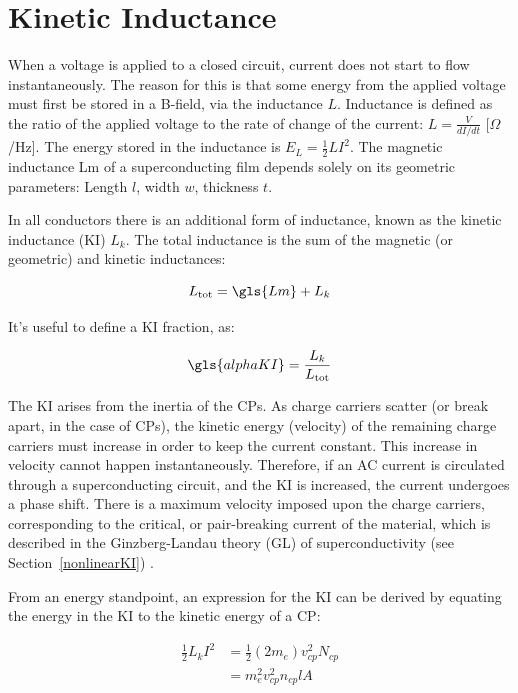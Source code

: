 \section{Kinetic Inductance}\label{sec:kinetic_inductance}

When a voltage is applied to a closed circuit, current does not start to flow instantaneously. The reason for this is that some energy from the applied voltage must first be stored in a B-field, via the inductance $L$. Inductance is defined as the ratio of the applied voltage to the rate of change of the current: $L = \frac{V}{dI/dt}$ [$\Omega$/Hz]. The energy stored in the inductance is $E_{L} = \frac{1}{2}LI^{2}$. The magnetic inductance \gls{Lm} of a superconducting film depends solely on its geometric parameters: Length $l$, width $w$, thickness $t$.

In all conductors there is an additional form of inductance, known as the kinetic inductance (KI) $L_{k}$. The total inductance is the sum of the magnetic (or geometric) and kinetic inductances:

\begin{equation}
  L_{\mathrm{tot}} = \gls{Lm} + L_{k}
\end{equation}

It's useful to define a KI fraction, as:

\begin{equation}
  \gls{alphaKI} = \frac{L_{k}}{L_{\mathrm{tot}}}
\end{equation}

The KI arises from the inertia of the CPs. As charge carriers scatter (or break apart, in the case of CPs), the kinetic energy (velocity) of the remaining charge carriers must increase in order to keep the current constant. This increase in velocity cannot happen instantaneously. Therefore, if an AC current is circulated through a superconducting circuit, and the KI is increased, the current undergoes a phase shift. There is a maximum velocity imposed upon the charge carriers, corresponding to the critical, or pair-breaking current of the material, which is described in the Ginzberg-Landau theory (GL) of superconductivity (see Section~\ref{nonlinearKI}) \citep{tinkham2004introduction}.

From an energy standpoint, an expression for the KI can be derived by equating the energy in the KI to the kinetic energy of a CP\@:

\begin{equation}
  \begin{aligned}
  \frac{1}{2}L_{k}I^{2} &= \frac{1}{2}(2m_{e})v_{cp}^{2}N_{cp}\\
                        &= m_{e}^{2}v_{cp}^{2}n_{cp}lA
  \end{aligned}
\end{equation}

